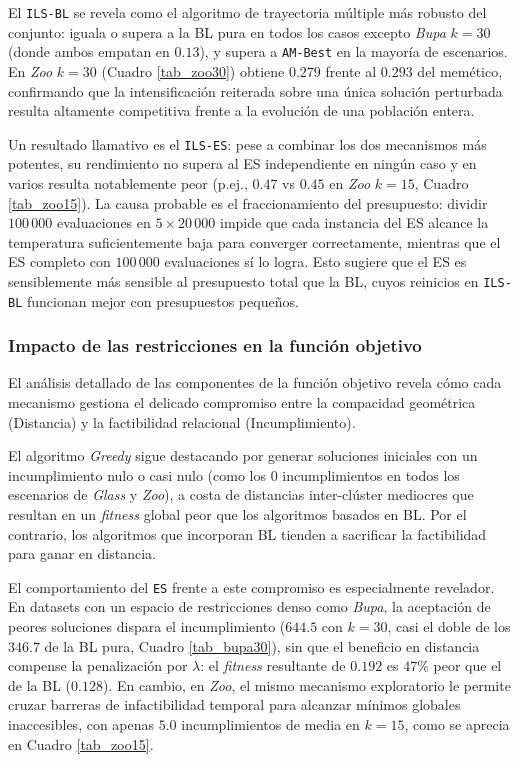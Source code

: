 \documentclass[a4paper,12pt]{article}%
\begin{document}
El \texttt{ILS-BL} se revela como el algoritmo de trayectoria múltiple más robusto del conjunto: iguala o supera a la BL pura en todos los casos excepto \textit{Bupa} $k=30$ (donde ambos empatan en $0.13$), y supera a \texttt{AM-Best} en la mayoría de escenarios. En \textit{Zoo} $k=30$ (Cuadro \ref{tab_zoo30}) obtiene $0.279$ frente al $0.293$ del memético, confirmando que la intensificación reiterada sobre una única solución perturbada resulta altamente competitiva frente a la evolución de una población entera.

Un resultado llamativo es el \texttt{ILS-ES}: pese a combinar los dos mecanismos más potentes, su rendimiento no supera al ES independiente en ningún caso y en varios resulta notablemente peor (p.ej., $0.47$ vs $0.45$ en \textit{Zoo} $k=15$, Cuadro \ref{tab_zoo15}). La causa probable es el fraccionamiento del presupuesto: dividir $100\,000$ evaluaciones en $5 \times 20\,000$ impide que cada instancia del ES alcance la temperatura suficientemente baja para converger correctamente, mientras que el ES completo con $100\,000$ evaluaciones sí lo logra. Esto sugiere que el ES es sensiblemente más sensible al presupuesto total que la BL, cuyos reinicios en \texttt{ILS-BL} funcionan mejor con presupuestos pequeños.


\subsubsection{Impacto de las restricciones en la función objetivo}

\noindent El análisis detallado de las componentes de la función objetivo revela cómo cada mecanismo gestiona el delicado compromiso entre la compacidad geométrica (Distancia) y la factibilidad relacional (Incumplimiento).

El algoritmo \textit{Greedy} sigue destacando por generar soluciones iniciales con un incumplimiento nulo o casi nulo (como los $0$ incumplimientos en todos los escenarios de \textit{Glass} y \textit{Zoo}), a costa de distancias inter-clúster mediocres que resultan en un \textit{fitness} global peor que los algoritmos basados en BL. Por el contrario, los algoritmos que incorporan BL tienden a sacrificar la factibilidad para ganar en distancia.

El comportamiento del \texttt{ES} frente a este compromiso es especialmente revelador. En datasets con un espacio de restricciones denso como \textit{Bupa}, la aceptación de peores soluciones dispara el incumplimiento ($644.5$ con $k=30$, casi el doble de los $346.7$ de la BL pura, Cuadro \ref{tab_bupa30}), sin que el beneficio en distancia compense la penalización por $\lambda$: el \textit{fitness} resultante de $0.192$ es $47\%$ peor que el de la BL ($0.128$). En cambio, en \textit{Zoo}, el mismo mecanismo exploratorio le permite cruzar barreras de infactibilidad temporal para alcanzar mínimos globales inaccesibles, con apenas $5.0$ incumplimientos de media en $k=15$, como se aprecia en Cuadro \ref{tab_zoo15}.
\end{document}
